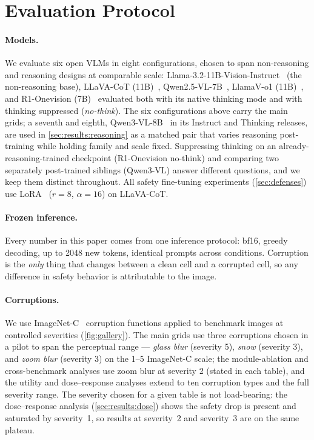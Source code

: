 \section{Evaluation Protocol}
\label{sec:setup}

\paragraph{Models.}
We evaluate six open VLMs in eight configurations, chosen to span non-reasoning and reasoning designs at comparable scale: Llama-3.2-11B-Vision-Instruct~\cite{llama3herd} (the non-reasoning base), LLaVA-CoT (11B)~\cite{xu2024llavacot}, Qwen2.5-VL-7B~\cite{bai2025qwen25vl}, LlamaV-o1 (11B)~\cite{thawakar2025llamavo1}, and R1-Onevision (7B)~\cite{yang2025r1onevision} evaluated both with its native thinking mode and with thinking suppressed (\emph{no-think}). The six configurations above carry the main grids; a seventh and eighth, Qwen3-VL-8B~\cite{qwen3vl2025} in its Instruct and Thinking releases, are used in \cref{sec:results:reasoning} as a matched pair that varies reasoning post-training while holding family and scale fixed. Suppressing thinking on an already-reasoning-trained checkpoint (R1-Onevision no-think) and comparing two separately post-trained siblings (Qwen3-VL) answer different questions, and we keep them distinct throughout. All safety fine-tuning experiments (\cref{sec:defenses}) use LoRA~\cite{hu2022lora} ($r{=}8$, $\alpha{=}16$) on LLaVA-CoT.

\paragraph{Frozen inference.}
Every number in this paper comes from one inference protocol: bf16, greedy decoding, up to 2048 new tokens, identical prompts across conditions. Corruption is the \emph{only} thing that changes between a clean cell and a corrupted cell, so any difference in safety behavior is attributable to the image.

\paragraph{Corruptions.}
We use ImageNet-C~\cite{hendrycks2019benchmarking} corruption functions applied to benchmark images at controlled severities (\cref{fig:gallery}). The main grids use three corruptions chosen in a pilot to span the perceptual range --- \emph{glass blur} (severity 5), \emph{snow} (severity 3), and \emph{zoom blur} (severity 3) on the 1--5 ImageNet-C scale; the module-ablation and cross-benchmark analyses use zoom blur at severity 2 (stated in each table), and the utility and dose--response analyses extend to ten corruption types and the full severity range. The severity chosen for a given table is not load-bearing: the dose--response analysis (\cref{sec:results:dose}) shows the safety drop is present and saturated by severity~1, so results at severity~2 and severity~3 are on the same plateau.

